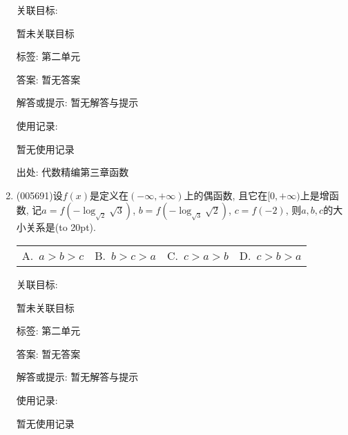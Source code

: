 \documentclass[10pt,a4paper]{article}
\newcommand{\bracket}[1]{(\hbox to #1pt{})}
\newcommand{\fourch}[4]{\par\begin{tabular}{p{.23\textwidth}p{.23\textwidth}p{.23\textwidth}p{.23\textwidth}}
A.~#1 &B.~#2& C.~#3& D.~#4
\end{tabular}}
\begin{document}
\begin{enumerate}[1.]
关联目标:

暂未关联目标



标签: 第二单元

答案: 暂无答案

解答或提示: 暂无解答与提示

使用记录:

暂无使用记录


出处: 代数精编第三章函数
\item { (005691)}设$f(x)$是定义在$(-\infty ,+\infty)$上的偶函数, 且它在$[0,+\infty)$上是增函数, 记$a=f(-\log_{\sqrt 2}\sqrt 3)$, $b=f(-\log_{\sqrt 3}\sqrt 2)$, $c=f(-2)$, 则$a,b,c$的大小关系是\bracket{20}.
\fourch{$a>b>c$}{$b>c>a$}{$c>a>b$}{$c>b>a$}


关联目标:

暂未关联目标



标签: 第二单元

答案: 暂无答案

解答或提示: 暂无解答与提示

使用记录:

暂无使用记录



\end{enumerate}
\end{document}
